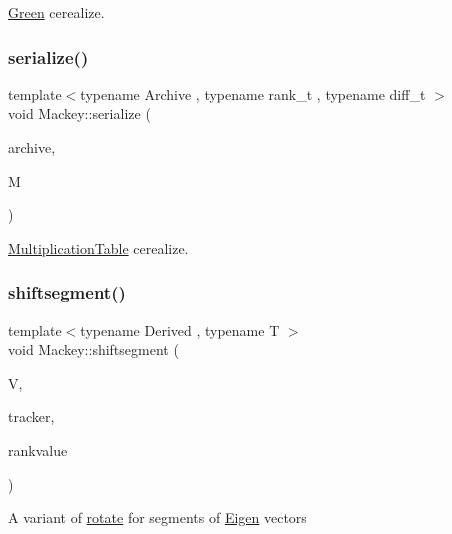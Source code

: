\hyperlink{classMackey_1_1Green}{Green} cerealize. 

\mbox{\label{namespaceMackey_ae5d73f6ab42eb8fe9ae441e3ffc4b3a5}} 
\subsubsection{\texorpdfstring{serialize()}{serialize()}\hspace{0.1cm}{\footnotesize\ttfamily [5/5]}}
{\footnotesize\ttfamily template$<$typename Archive , typename rank\+\_\+t , typename diff\+\_\+t $>$ \\
void Mackey\+::serialize (\begin{DoxyParamCaption}\item[{Archive \&}]{archive,  }\item[{\hyperlink{classMackey_1_1MultiplicationTable}{Multiplication\+Table}$<$ rank\+\_\+t, diff\+\_\+t $>$ \&}]{M }\end{DoxyParamCaption})}



\hyperlink{classMackey_1_1MultiplicationTable}{Multiplication\+Table} cerealize. 

\mbox{\label{namespaceMackey_aab8a6292210a3b71960cb03b79d218e6}} 
\subsubsection{\texorpdfstring{shiftsegment()}{shiftsegment()}}
{\footnotesize\ttfamily template$<$typename Derived , typename T $>$ \\
void Mackey\+::shiftsegment (\begin{DoxyParamCaption}\item[{Eigen\+::\+Matrix\+Base$<$ Derived $>$ \&}]{V,  }\item[{int}]{tracker,  }\item[{T}]{rankvalue }\end{DoxyParamCaption})}

A variant of \hyperlink{namespaceMackey_a38a833de54971845cbdb8c96f830725b}{rotate} for segments of \hyperlink{namespaceEigen}{Eigen} vectors


